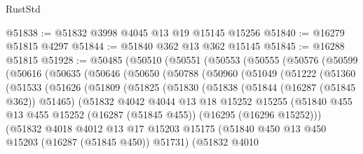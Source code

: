 \begin{lexlean}{RustStd}
\begin{coremodule}
@51838 := @51832 @3998 @4045 @13 @19 @15145 @15256
@51840 := @16279 @51815 @4297
@51844 := @51840 @362 @13 @362 @15145
@51845 := @16288 @51815
@51928 := @50485
    (@50510
      (@50551
        (@50553
          (@50555
            (@50576
              (@50599
                (@50616
                  (@50635
                    (@50646
                      (@50650
                        (@50788
                          (@50960
                            (@51049
                              (@51222
                                (@51360
                                  (@51533
                                    (@51626
                                      (@51809
                                        (@51825
                                          (@51830
                                            (@51838
                                              (@51844 (@16287 (@51845 @362)) @51465)
                                              (@51832
                                                @4042
                                                @4044
                                                @13
                                                @18
                                                @15252
                                                @15255
                                                (@51840
                                                  @455
                                                  @13
                                                  @455
                                                  @15252
                                                  (@16287 (@51845 @455))
                                                  (@16295 (@16296 @15252)))
                                                (@51832
                                                  @4018
                                                  @4012
                                                  @13
                                                  @17
                                                  @15203
                                                  @15175
                                                  (@51840
                                                    @450
                                                    @13
                                                    @450
                                                    @15203
                                                    (@16287 (@51845 @450))
                                                    @51731)
                                                  (@51832
                                                    @4010

\end{coremodule}
\end{lexlean}

